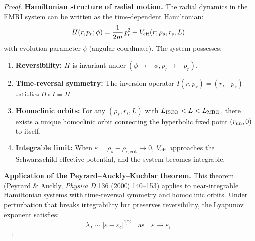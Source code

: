 \documentclass[
]{article}
\begin{document}
\begin{proof}
\textbf{Hamiltonian structure of radial motion.} The radial dynamics in the EMRI system can be written as the time-dependent Hamiltonian:
\begin{equation}
H(r, p_r; \phi) = \frac{1}{2m}\,p_r^2 + V_{\rm eff}(r; \rho_s, r_s, L)
\end{equation}
with evolution parameter $\phi$ (angular coordinate). The system possesses:
\begin{enumerate}
\item \textbf{Reversibility:} $H$ is invariant under $(\phi \to -\phi, p_r \to -p_r)$.
\item \textbf{Time-reversal symmetry:} The inversion operator $I(r, p_r) = (r, -p_r)$ satisfies $H \circ I = H$.
\item \textbf{Homoclinic orbits:} For any $(\rho_s, r_s, L)$ with $L_{\rm ISCO} < L < L_{\rm MBO}$, there exists a unique homoclinic orbit connecting the hyperbolic fixed point $(r_{\rm un}, 0)$ to itself.
\item \textbf{Integrable limit:} When $\varepsilon = \rho_s - \rho_{s,\text{crit}} \to 0$, $V_{\rm eff}$ approaches the Schwarzschild effective potential, and the system becomes integrable.
\end{enumerate}

\textbf{Application of the Peyrard--Auckly--Kuchlar theorem.} This theorem (Peyrard \& Auckly, \textit{Physica D} 136 (2000) 140--153) applies to near-integrable Hamiltonian systems with time-reversal symmetry and homoclinic orbits. Under perturbation that breaks integrability but preserves reversibility, the Lyapunov exponent satisfies:
\begin{equation}
\lambda_T \sim |\varepsilon - \varepsilon_c|^{1/2} \quad \text{as} \quad \varepsilon \to \varepsilon_c
\end{equation}


\end{proof}
\end{document}
